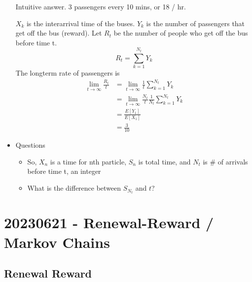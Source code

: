 \documentclass{report}
\begin{document}
\begin{itemize}
        {
          Intuitive answer.  3 passengers every 10 mins, or 18 / hr.

          $X_k$ is the interarrival time of the buses. $Y_k$ is the 
          number of passengers that get off the bus (reward).  Let $R_t$
          be the number of people who get off the bus before time t.
          \[ R_t = \sum^{N_t}_{k=1} Y_k \]
          The longterm rate of passengers is
          \begin{align*}
            \lim_{t \to \infty} \frac{R_t}{t} &= \lim_{t \to \infty} \frac{1}{t} \sum^{N_t}_{k=1} Y_k \\
                  &= \lim_{t \to \infty} \frac{N_t}{t} \frac{1}{N_t} 
                             \sum^{N_t}_{k=1} Y_k \\
                  &= \frac{E[Y_1]}{E[X_1]} \\
                  &= \frac{3}{10} 
          \end{align*}
        }
        

      \item Questions
        \begin{itemize}
          \item So, $X_n$ is a time for nth particle,  $S_n$ is total time,
            and $N_t$ is \# of arrivals before time t, an integer
          \item What is the difference between $S_{N_t}$ and $t$?
        \end{itemize}
      

  \end{itemize}

\chapter*{20230621 - Renewal-Reward / Markov Chains}
\section*{Renewal Reward}%
\end{document}
